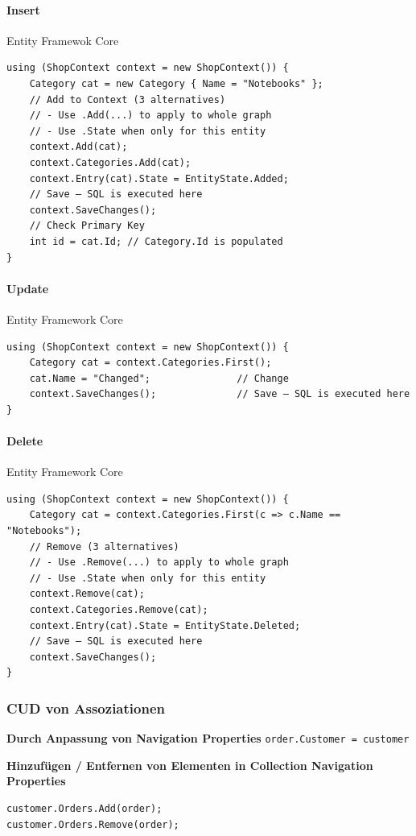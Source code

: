 \documentclass[
a4paper,
oneside,
10pt,
fleqn,
headsepline,
toc=listofnumbered, 
bibliography=totocnumbered]{scrartcl}
\begin{document}
\paragraph{Insert} Entity Framewok Core
\begin{lstlisting}
using (ShopContext context = new ShopContext()) {
    Category cat = new Category { Name = "Notebooks" };
    // Add to Context (3 alternatives)
    // - Use .Add(...) to apply to whole graph
    // - Use .State when only for this entity
    context.Add(cat);
    context.Categories.Add(cat);
    context.Entry(cat).State = EntityState.Added;
    // Save – SQL is executed here
    context.SaveChanges();
    // Check Primary Key
    int id = cat.Id; // Category.Id is populated
}
\end{lstlisting}

\paragraph{Update} Entity Framework Core
\begin{lstlisting}
using (ShopContext context = new ShopContext()) {
    Category cat = context.Categories.First();
    cat.Name = "Changed";               // Change
    context.SaveChanges();              // Save – SQL is executed here
}
\end{lstlisting}

\paragraph{Delete} Entity Framework Core
\begin{lstlisting}
using (ShopContext context = new ShopContext()) {
    Category cat = context.Categories.First(c => c.Name == "Notebooks");
    // Remove (3 alternatives)
    // - Use .Remove(...) to apply to whole graph
    // - Use .State when only for this entity
    context.Remove(cat);
    context.Categories.Remove(cat);
    context.Entry(cat).State = EntityState.Deleted;
    // Save – SQL is executed here
    context.SaveChanges();              
}
\end{lstlisting}

\subsubsection{CUD von Assoziationen}
\textbf{Durch Anpassung von Navigation Properties}
\lstinline{order.Customer = customer}

\textbf{Hinzufügen / Entfernen von Elementen in Collection Navigation Properties}
\begin{lstlisting}
customer.Orders.Add(order);
customer.Orders.Remove(order);
\end{lstlisting}
\end{document}
